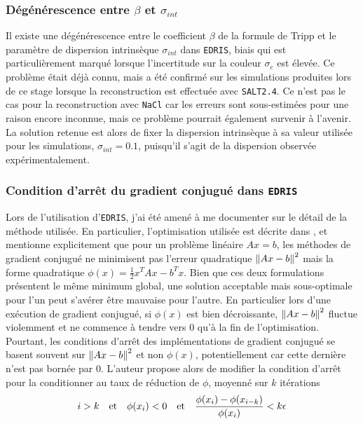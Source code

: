 \documentclass{book}
\def\nacl{\texttt{NaCl}\xspace}
\def\edris{\texttt{EDRIS}\xspace}
\def\saltd{\texttt{SALT2.4}\xspace}
\begin{document}
\subsubsection{Dégénérescence entre $\beta$ et $\sigma_{int}$} 

Il existe une dégénérescence entre le coefficient $\beta$ de la formule de Tripp et le paramètre de dispersion intrinsèque $\sigma_{int}$ dans \edris, biais qui est particulièrement marqué lorsque l'incertitude sur la couleur $\sigma_c$ est élevée. Ce problème était déjà connu, mais a été confirmé sur les simulations produites lors de ce stage lorsque la reconstruction est effectuée avec \saltd. Ce n'est pas le cas pour la reconstruction avec \nacl car les erreurs sont sous-estimées pour une raison encore inconnue, mais ce problème pourrait également survenir à l'avenir. La solution retenue est alors de fixer la dispersion intrinsèque à sa valeur utilisée pour les simulations, $\sigma_{int} = 0.1$, puisqu'il s'agit de la dispersion observée expérimentalement.

\subsubsection{Condition d'arrêt du gradient conjugué dans \edris}

Lors de l'utilisation d'\edris, j'ai été amené à me documenter sur le détail de la méthode utilisée. En particulier, l'optimisation utilisée est décrite dans \cite{martens_deep_2010}, et mentionne explicitement que pour un problème linéaire $Ax = b$, les méthodes de gradient conjugué ne minimisent pas l'erreur quadratique $\norm{Ax-b}^2$ mais la forme quadratique $\phi(x) = \frac{1}{2} x^T A x - b^T x$. Bien que ces deux formulations présentent le même minimum global, une solution acceptable mais sous-optimale pour l'un peut s'avérer être mauvaise pour l'autre. En particulier lors d'une exécution de gradient conjugué, si $\phi(x)$ est bien décroissante, $\norm{Ax-b}^2$ fluctue violemment et ne commence à tendre vers 0 qu'à la fin de l'optimisation. Pourtant, les conditions d'arrêt des implémentations de gradient conjugué se basent souvent sur $\norm{Ax-b}^2$ et non $\phi(x)$, potentiellement car cette dernière n'est pas bornée par 0. L'auteur propose alors de modifier la condition d'arrêt pour la conditionner au taux de réduction de $\phi$, moyenné sur $k$ itérations
\begin{equation}
	i > k \qq{et} \phi(x_i) < 0 \qq{et} \frac{\phi(x_i) - \phi(x_{i-k})}{\phi(x_i)} < k \epsilon
\end{equation}
\end{document}
